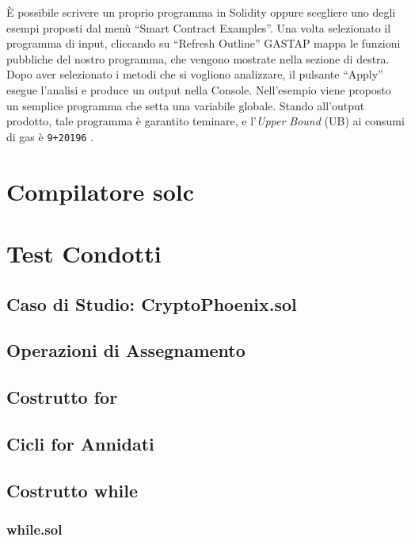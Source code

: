     \`E possibile scrivere un proprio programma in Solidity oppure scegliere uno degli esempi proposti dal menù ``Smart Contract Examples''.\newline
    \indent Una volta selezionato il programma di input, cliccando su ``Refresh Outline'' GASTAP mappa le funzioni pubbliche del nostro programma, che vengono mostrate nella sezione di destra. Dopo aver selezionato i metodi che si vogliono analizzare, il pulsante ``Apply'' esegue l'analisi e produce un output nella Console.\newline
    \indent Nell'esempio viene proposto un semplice programma che setta una variabile globale. Stando all'output prodotto, tale programma è garantito teminare, e l'\textit{Upper Bound} (UB) ai consumi di gas è \verb|9+20196| .

    

    
\section{Compilatore solc}

\section{Test Condotti}

    \subsection{Caso di Studio: CryptoPhoenix.sol}

    \subsection{Operazioni di Assegnamento}

    \subsection{Costrutto for}
    
    \subsection{Cicli for Annidati}

    \subsection{Costrutto while}
    
        \subsubsection{while.sol}

